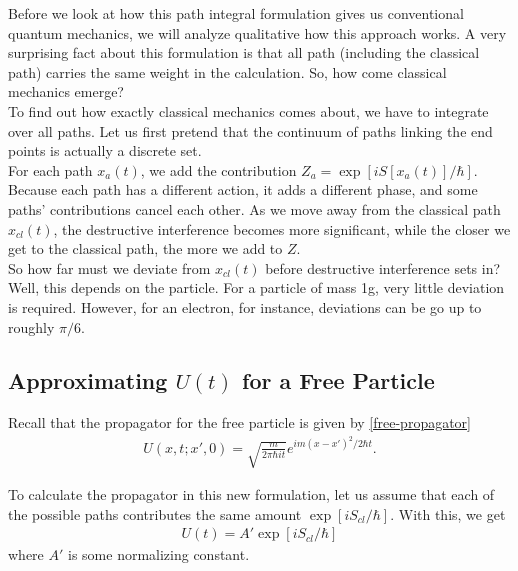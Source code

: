 \documentclass{book}
\theoremstyle{definition}
\newcommand{\f}[2]{\frac{#1}{#2}}
\begin{document}
Before we look at how this path integral formulation gives us conventional quantum mechanics, we will analyze qualitative how this approach works. A very surprising fact about this formulation is that all path (including the classical path) carries the same weight in the calculation. So, how come classical mechanics emerge?\\

To find out how exactly classical mechanics comes about, we have to integrate over all paths. Let us first pretend that the continuum of paths linking the end points is actually a discrete set. \\

For each path $x_a(t)$, we add the contribution $Z_a = \exp[iS[x_a(t)]/\hbar]$. Because each path has a different action, it adds a different phase, and some paths' contributions cancel each other. As we move away from the classical path $x_{cl}(t)$, the destructive interference becomes more significant, while the closer we get to the classical path, the more we add to $Z$. \\

So how far must we deviate from $x_{cl}(t)$ before destructive interference sets in? Well, this depends on the particle. For a particle of mass 1g, very little deviation is required. However, for an electron, for instance, deviations can be go up to roughly $\pi/6$. 


\subsection{Approximating $U(t)$ for a Free Particle}

Recall that the propagator for the free particle is given by \eqref{free-propagator}
\begin{align}
U(x,t; x',0) = \sqrt{\f{m}{2\pi \hbar it}} e^{im(x-x')^2/2\hbar t}.
\end{align}

To calculate the propagator in this new formulation, let us assume that each of the possible paths contributes the same amount $\exp[iS_{cl}/\hbar]$. With this, we get
\begin{align}
U(t) = A' \exp[iS_{cl}/\hbar]
\end{align}
where $A'$ is some normalizing constant. \\
\end{document}

